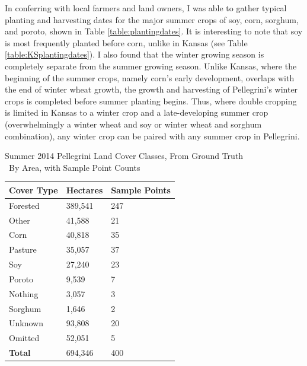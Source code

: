 In conferring with local farmers and land owners, I was able to gather typical planting and harvesting dates for the major summer crops of soy, corn, sorghum, and poroto, shown in Table \ref{table:plantingdates}. It is interesting to note that soy is most frequently planted before corn, unlike in Kansas (see Table \ref{table:KSplantingdates}). I also found that the winter growing season is completely separate from the summer growing season. Unlike Kansas, where the beginning of the summer crops, namely corn's early development, overlaps with the end of winter wheat growth, the growth and harvesting of Pellegrini's winter crops is completed before summer planting begins. Thus, where double cropping is limited in Kansas to a winter crop and a late-developing summer crop (overwhelmingly a winter wheat and soy or winter wheat and sorghum combination), any winter crop can be paired with any summer crop in Pellegrini.


\begin{sstable}
  \centering
  \caption[Summer 2014 Pellegrini Land Cover Classes, From Ground Truth]{Summer 2014 Pellegrini Land Cover Classes, From Ground Truth\\~By Area, with Sample Point Counts}
  \label{table:pellegrini:LCarea}
  \begin{tabu}{XX[r]X[r]}
    \toprule
    \textbf{Cover Type} & \textbf{Hectares} & \textbf{Sample Points} \\
    \midrule
    Forested & 389,541 & 247 \\
    Other & 41,588 & 21 \\
    Corn & 40,818 & 35 \\
    Pasture & 35,057 & 37 \\
    Soy & 27,240 & 23 \\
    Poroto & 9,539 & 7 \\
    Nothing & 3,057 & 3 \\
    Sorghum & 1,646 & 2 \\
    \midrule
    Unknown & 93,808 & 20 \\
    Omitted & 52,051 & 5 \\
    \midrule
    \textbf{Total} & 694,346 & 400 \\
    \bottomrule
  \end{tabu}
\end{sstable}

